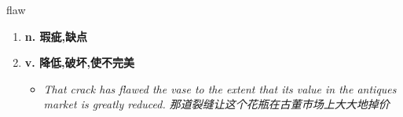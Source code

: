 
\begin{frame}
{\huge flaw}
\begin{center}
\begin{enumerate}\Large
  \item \textbf{n. 瑕疵,缺点}
  \item \textbf{v. 降低,破坏,使不完美}
  \begin{itemize}
    \item \em{\Large{That crack has flawed the vase to the extent that its value in the antiques market is greatly reduced. 那道裂缝让这个花瓶在古董市场上大大地掉价}}
  \end{itemize}
\end{enumerate}
\end{center}
\end{frame}
